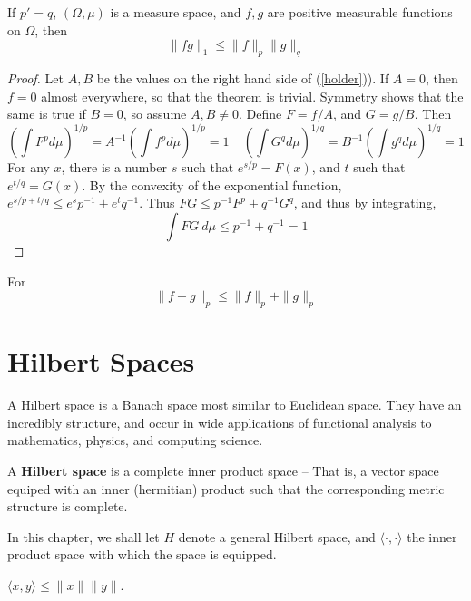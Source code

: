 \begin{theorem}[H\"{o}lder]
    If $p' = q$, $(\Omega,\mu)$ is a measure space, and $f,g$ are positive measurable functions on $\Omega$, then
    \begin{equation} \label{holder} \| fg \|_1 \leq \| f \|_p \| g \|_q \end{equation}
\end{theorem}
\begin{proof}
    Let $A,B$ be the values on the right hand side of (\ref{holder})). If $A = 0$, then $f = 0$ almost everywhere, so that the theorem is trivial. Symmetry shows that the same is true if $B = 0$, so assume $A, B \neq 0$. Define $F = f/A$, and $G = g/B$. Then
    \[ \left( \int F^p d\mu \right)^{1/p} = A^{-1} \left( \int f^p d\mu \right)^{1/p} = 1\ \ \ \ \ \left( \int G^q d\mu \right)^{1/q} = B^{-1} \left( \int g^q d\mu \right)^{1/q} = 1 \]
    For any $x$, there is a number $s$ such that $e^{s/p} = F(x)$, and $t$ such that $e^{t/q} = G(x)$. By the convexity of the exponential function, $e^{s/p + t/q} \leq e^s p^{-1} + e^t q^{-1}$. Thus $FG \leq p^{-1} F^p + q^{-1} G^q$, and thus by integrating,
    \[ \int FG\ d\mu \leq p^{-1} + q^{-1} = 1 \]
\end{proof}

\begin{corollary}[Minkowski]
    For
    \[ \| f + g \|_p \leq \| f \|_p + \| g \|_p \]
\end{corollary}



\chapter{Hilbert Spaces}

A Hilbert space is a Banach space most similar to Euclidean space. They have an incredibly structure, and occur in wide applications of functional analysis to mathematics, physics, and computing science.

\begin{definition}
    A {\bf Hilbert space} is a complete inner product space -- That is, a vector space equiped with an inner (hermitian) product such that the corresponding metric structure is complete.
\end{definition}

In this chapter, we shall let $H$ denote a general Hilbert space, and $\langle \cdot, \cdot \rangle$ the inner product space with which the space is equipped.

\begin{theorem}
    $\langle x, y \rangle \leq \| x \| \| y \|$.
\end{theorem}

